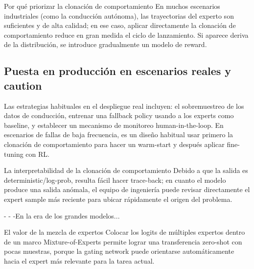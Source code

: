\documentclass[a4paper]{article}
\begin{document}
\begin{knowledgebox}{Por qué priorizar la clonación de comportamiento}
En muchos escenarios industriales (como la conducción autónoma), las trayectorias del experto son suficientes y de alta calidad; en ese caso, aplicar directamente la clonación de comportamiento reduce en gran medida el ciclo de lanzamiento. Si aparece deriva de la distribución, se introduce gradualmente un modelo de reward.
\end{knowledgebox}

\subsection{Puesta en producción en escenarios reales y caution}

Las estrategias habituales en el despliegue real incluyen: el sobremuestreo de los datos de conducción, entrenar una fallback policy usando a los experts como baseline, y establecer un mecanismo de monitoreo human-in-the-loop. En escenarios de fallas de baja frecuencia, es un diseño habitual usar primero la clonación de comportamiento para hacer un warm-start y después aplicar fine-tuning con RL.

\begin{importantbox}{La interpretabilidad de la clonación de comportamiento}
Debido a que la salida es deterministic/log-prob, resulta fácil hacer trace-back; en cuanto el modelo produce una salida anómala, el equipo de ingeniería puede revisar directamente el expert sample más reciente para ubicar rápidamente el origen del problema.
\end{importantbox}

-
-
-En la era de los grandes modelos...

\begin{knowledgebox}{El valor de la mezcla de expertos}
Colocar los logits de múltiples expertos dentro de un marco Mixture-of-Experts permite lograr una transferencia zero-shot con pocas muestras, porque la gating network puede orientarse automáticamente hacia el expert más relevante para la tarea actual.
\end{knowledgebox}
\end{document}
